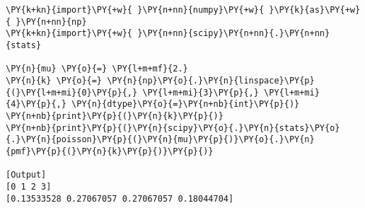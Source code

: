 \begin{Verbatim}[label=\makebox{\href{https://github.com/unipi-physics-labs/statnotes/tree/main/snippy/scipy.stats.poisson.py}{https://github.com/.../scipy.stats.poisson.py}},commandchars=\\\{\}]
\PY{k+kn}{import}\PY{+w}{ }\PY{n+nn}{numpy}\PY{+w}{ }\PY{k}{as}\PY{+w}{ }\PY{n+nn}{np}
\PY{k+kn}{import}\PY{+w}{ }\PY{n+nn}{scipy}\PY{n+nn}{.}\PY{n+nn}{stats}

\PY{n}{mu} \PY{o}{=} \PY{l+m+mf}{2.}
\PY{n}{k} \PY{o}{=} \PY{n}{np}\PY{o}{.}\PY{n}{linspace}\PY{p}{(}\PY{l+m+mi}{0}\PY{p}{,} \PY{l+m+mi}{3}\PY{p}{,} \PY{l+m+mi}{4}\PY{p}{,} \PY{n}{dtype}\PY{o}{=}\PY{n+nb}{int}\PY{p}{)}
\PY{n+nb}{print}\PY{p}{(}\PY{n}{k}\PY{p}{)}
\PY{n+nb}{print}\PY{p}{(}\PY{n}{scipy}\PY{o}{.}\PY{n}{stats}\PY{o}{.}\PY{n}{poisson}\PY{p}{(}\PY{n}{mu}\PY{p}{)}\PY{o}{.}\PY{n}{pmf}\PY{p}{(}\PY{n}{k}\PY{p}{)}\PY{p}{)}

[Output]
[0 1 2 3]
[0.13533528 0.27067057 0.27067057 0.18044704]
\end{Verbatim}
